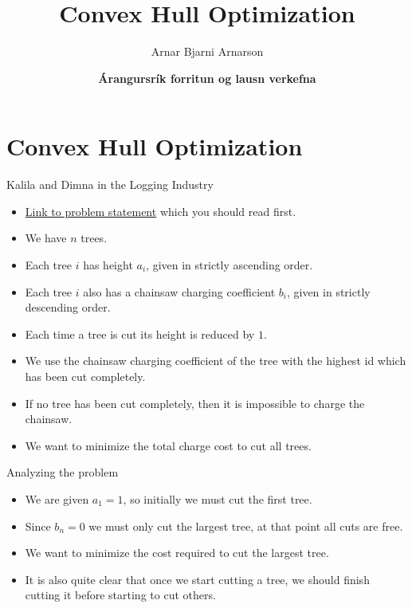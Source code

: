 \documentclass{beamer}
\title{Convex Hull Optimization}
\author{Arnar Bjarni Arnarson}
\institute{\href{http://ru.is/td}{School of Computer Science} \\[2pt] \href{http://ru.is}{Reykjavík University}}
\date{\textbf{Árangursrík forritun og lausn verkefna}}
\begin{document}
\begin{frame}[plain]
    \titlepage
\end{frame}

\section*{Convex Hull Optimization}

\begin{frame}[plain]{Kalila and Dimna in the Logging Industry}
    \begin{itemize}
        \item<1-> \href{https://codeforces.com/problemset/problem/319/C}{Link to problem statement} which you should read first.
        \item<2-> We have $n$ trees.
        \item<3-> Each tree $i$ has height $a_i$, given in strictly ascending order.
        \item<4-> Each tree $i$ also has a chainsaw charging coefficient $b_i$, given in strictly descending order.
        \item<5-> Each time a tree is cut its height is reduced by $1$.
        \item<6-> We use the chainsaw charging coefficient of the tree with the highest id which has been cut completely.
        \item<7-> If no tree has been cut completely, then it is impossible to charge the chainsaw.
        \item<9-> We want to minimize the total charge cost to cut all trees.
    \end{itemize}
\end{frame}

\begin{frame}[plain]{Analyzing the problem}
    \begin{itemize}
        \item<1-> We are given $a_1 = 1$, so initially we must cut the first tree.
        \item<2-> Since $b_n = 0$ we must only cut the largest tree, at that point all cuts are free.
        \item<3-> We want to minimize the cost required to cut the largest tree.
        \item<4-> It is also quite clear that once we start cutting a tree, we should finish cutting it before starting to cut others.
    \end{itemize}
\end{frame}
\end{document}
